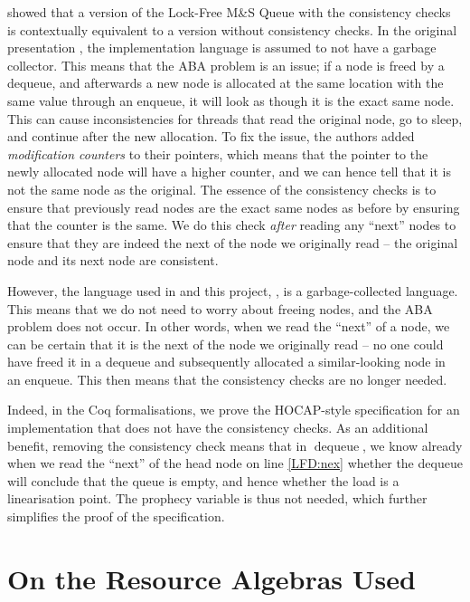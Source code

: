 \documentclass[a4paper, 10pt]{report}
\theoremstyle{definition}
\newcommand{\dequeue}{\operatorname{dequeue}}
\newcommand{\msq}{M\&S Queue}
\newcommand{\lfmsq}{Lock-Free \msq{}}
\begin{document}
\citet{DBLP:conf/cpp/VindumB21} showed that a version of the \lfmsq{} with the consistency checks is contextually equivalent to a version without consistency checks. In the original presentation \citep{DBLP:conf/podc/MichaelS96}, the implementation language is assumed to not have a garbage collector. This means that the ABA problem is an issue; if a node is freed by a dequeue, and afterwards a new node is allocated at the same location with the same value through an enqueue, it will look as though it is the exact same node. This can cause inconsistencies for threads that read the original node, go to sleep, and continue after the new allocation.
To fix the issue, the authors added \textit{modification counters} to their pointers, which means that the pointer to the newly allocated node will have a higher counter, and we can hence tell that it is not the same node as the original. The essence of the consistency checks is to ensure that previously read nodes are the exact same nodes as before by ensuring that the counter is the same.
We do this check \textit{after} reading any ``next'' nodes to ensure that they are indeed the next of the node we originally read -- the original node and its next node are consistent.

However, the language used in \citet{DBLP:conf/cpp/VindumB21} and this project, \heaplang, is a garbage-collected language. This means that we do not need to worry about freeing nodes, and the ABA problem does not occur. In other words, when we read the ``next'' of a node, we can be certain that it is the next of the node we originally read -- no one could have freed it in a dequeue and subsequently allocated a similar-looking node in an enqueue. This then means that the consistency checks are no longer needed.

Indeed, in the Coq formalisations, we prove the HOCAP-style specification for an implementation that does not have the consistency checks. As an additional benefit, removing the consistency check means that in $\dequeue$, we know already when we read the ``next'' of the head node on line \ref{LFD:nex} whether the dequeue will conclude that the queue is empty, and hence whether the load is a linearisation point. The prophecy variable is thus not needed, which further simplifies the proof of the specification.


\chapter{On the Resource Algebras Used}
\label{ch:RA}
\end{document}
